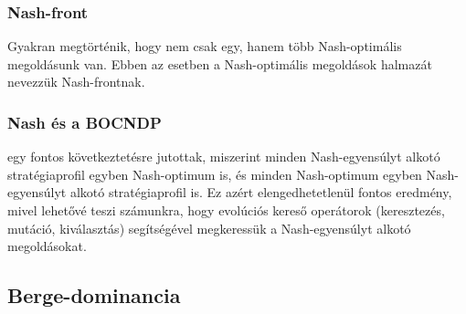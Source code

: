 \subsubsection{Nash-front}
Gyakran megtörténik, hogy nem csak egy, hanem több Nash-optimális megoldásunk van.
Ebben az esetben a Nash-optimális megoldások halmazát nevezzük Nash-frontnak.


\subsubsection{Nash és a BOCNDP}
 egy fontos következtetésre jutottak, miszerint minden Nash-egyensúlyt alkotó stratégiaprofil egyben Nash-optimum is, és minden Nash-optimum egyben Nash-egyensúlyt alkotó stratégiaprofil is.
Ez azért elengedhetetlenül fontos eredmény, mivel lehetővé teszi számunkra, hogy evolúciós kereső operátorok (keresztezés, mutáció, kiválasztás) segítségével megkeressük a Nash-egyensúlyt alkotó megoldásokat.


\subsection{Berge-dominancia}

